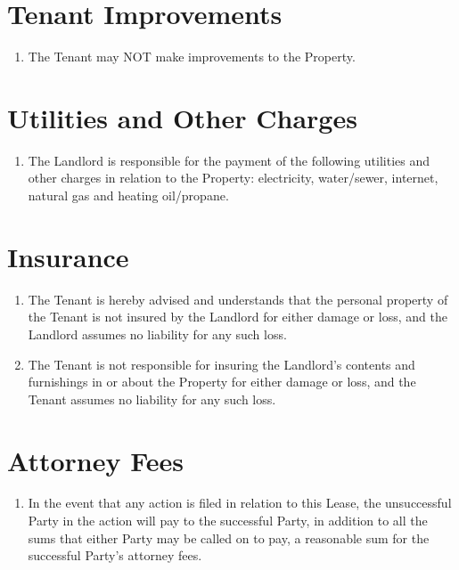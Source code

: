 \documentclass[12pt]{article}
\begin{document}
\section*{Tenant Improvements}

\begin{enumerate}[resume]
    \item The Tenant may NOT make improvements to the Property.
\end{enumerate}    
   
\section*{Utilities and Other Charges}

\begin{enumerate}[resume]
    \item The Landlord is responsible for the payment of the following
	    utilities and other charges in relation to the Property:
		electricity, water/sewer, internet, natural gas and heating
		oil/propane.
\end{enumerate}
   
\section*{Insurance}

\begin{enumerate}[resume]  
    \item The Tenant is hereby advised and understands that the personal
	    property of the Tenant is not insured by the Landlord for either
		damage or loss, and the Landlord assumes no liability for any
		such loss.
    \item The Tenant is not responsible for insuring the Landlord's contents
	    and furnishings in or about the Property for either damage or loss,
		and the Tenant assumes no liability for any such loss.
\end{enumerate}
    
\section*{Attorney Fees}
\begin{enumerate}[resume]
    \item In the event that any action is filed in relation to this Lease, the
	    unsuccessful Party in the action will pay to the successful Party,
		in addition to all the sums that either Party may be called on
		to pay, a reasonable sum for the successful Party's attorney
		fees.
\end{enumerate}
   
\end{document}
